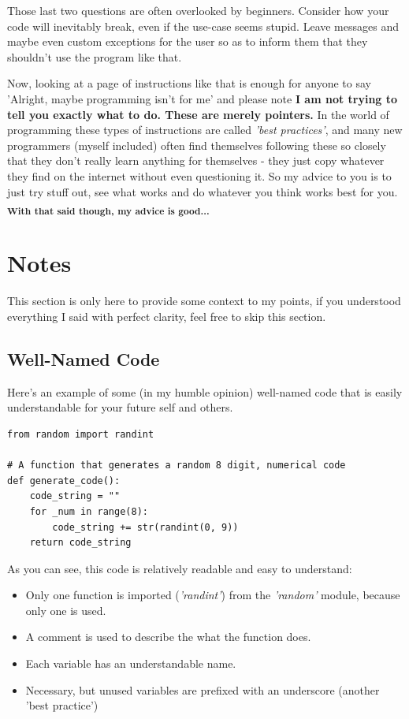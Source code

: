 \documentclass{article}
\begin{document}
\begin{itemize}
    Those last two questions are often overlooked by beginners. Consider how your code will inevitably break, even if the use-case seems stupid. Leave messages and maybe even custom exceptions for the user so as to inform them that they shouldn't use the program like that.
\end{itemize}
Now, looking at a page of instructions like that is enough for anyone to say 'Alright, maybe programming isn't for me' and please note \textbf{I am not trying to tell you exactly what to do. These are merely pointers.} In the world of programming these types of instructions are called \textit{'best practices'}, and many new programmers (myself included) often find themselves following these so closely that they don't really learn anything for themselves - they just copy whatever they find on the internet without even questioning it. So my advice to you is to just try stuff out, see what works and do whatever you think works best for you. \textsubscript{\textbf{With that said though, my advice is good...}}

\section{Notes}
This section is only here to provide some context to my points, if you understood everything I said with perfect clarity, feel free to skip this section.
\subsection{Well-Named Code}

Here's an example of some (in my humble opinion) well-named code that is easily understandable for your future self and others.
\begin{verbatim}
from random import randint

# A function that generates a random 8 digit, numerical code
def generate_code():
    code_string = ""
    for _num in range(8):
        code_string += str(randint(0, 9))
    return code_string
\end{verbatim}

As you can see, this code is relatively readable and easy to understand:
\begin{itemize}
    \item Only one function is imported (\textit{'randint'}) from the \textit{'random'} module, because only one is used.
    \item A comment is used to describe the what the function does.
    \item Each variable has an understandable name.
    \item Necessary, but unused variables are prefixed with an underscore (another 'best practice')
\end{itemize}
\end{document}
